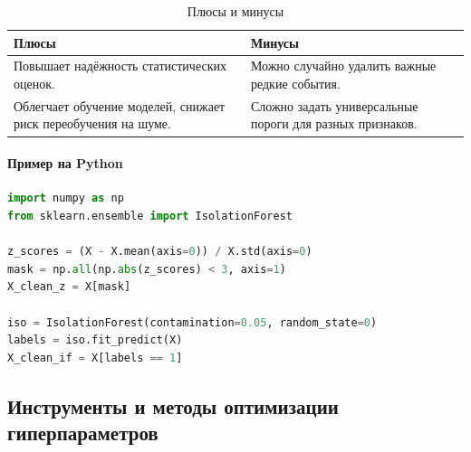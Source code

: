 \begin{center}
\begin{table}[h]
\centering
\caption{Плюсы и минусы}
\label{tab:pros_cons}
\begin{tabularx}{\textwidth}{@{}>{\raggedright\arraybackslash}X>{\raggedright\arraybackslash}X@{}}
\toprule
\textbf{Плюсы} & \textbf{Минусы} \\
\midrule
Повышает надёжность статистических оценок. & Можно случайно удалить важные редкие события. \\
\addlinespace[0.5em]
Облегчает обучение моделей, снижает риск переобучения на шуме. & Сложно задать универсальные пороги для разных признаков. \\
\bottomrule
\end{tabularx}
\end{table}

\paragraph{Пример на Python}
\begin{lstlisting}[language=Python]
import numpy as np
from sklearn.ensemble import IsolationForest

z_scores = (X - X.mean(axis=0)) / X.std(axis=0)
mask = np.all(np.abs(z_scores) < 3, axis=1)
X_clean_z = X[mask]

iso = IsolationForest(contamination=0.05, random_state=0)
labels = iso.fit_predict(X)
X_clean_if = X[labels == 1]
\end{lstlisting}

%
\subsection{Инструменты и методы оптимизации гиперпараметров}
\label{sec:hyperparameter-optimization}


\end{center}
